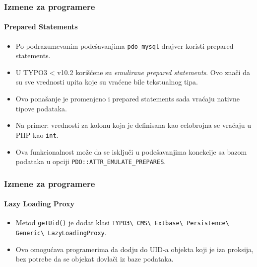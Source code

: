 \begin{frame}[fragile]
	\frametitle{Izmene za programere}
	\framesubtitle{Prepared Statements}

	\lstset{basicstyle=\tiny\ttfamily}

	\begin{itemize}
		\item Po podrazumevanim podešavanjima \texttt{pdo\_mysql} drajver koristi prepared statements.
		\item U TYPO3 < v10.2 korišćene su \textit{emulirane prepared statements}.
			Ovo znači da su sve vrednosti upita koje su vraćene bile tekstualnog tipa.
		\item Ovo ponašanje je promenjeno i prepared statements sada vraćaju nativne tipove podataka.
		\item Na primer: vrednosti za kolonu koja je definisana kao celobrojna se vraćaju u PHP kao \texttt{int}.
		\item Ova funkcionalnost može da se isključi u podešavanjima konekcije sa bazom podataka
			u opciji \texttt{PDO::ATTR\_EMULATE\_PREPARES}.

	\end{itemize}

\end{frame}


\begin{frame}[fragile]
	\frametitle{Izmene za programere}
	\framesubtitle{Lazy Loading Proxy}

	\lstset{basicstyle=\tiny\ttfamily}

	\begin{itemize}
		\item Metod \texttt{getUid()} je dodat klasi\newline
			\texttt{TYPO3\textbackslash
				CMS\textbackslash
				Extbase\textbackslash
				Persistence\textbackslash
				Generic\textbackslash
				LazyLoadingProxy}.
		\item Ovo omogućava programerima da dodju do UID-a objekta koji je iza proksija,
			bez potrebe da se objekat dovlači iz baze podataka.

	\end{itemize}

\end{frame}


